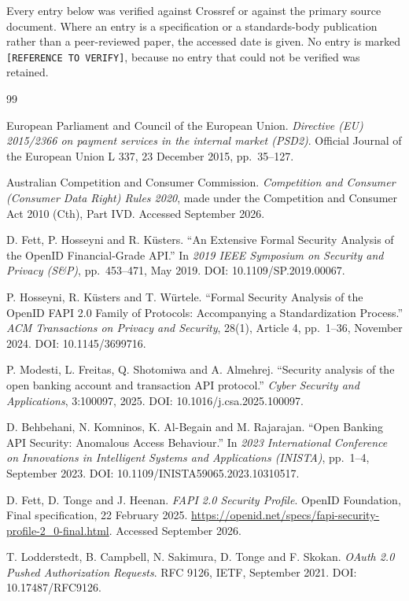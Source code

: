 Every entry below was verified against Crossref or against the primary source document. Where an entry is a specification or a standards-body publication rather than a peer-reviewed paper, the accessed date is given. No entry is marked \texttt{[REFERENCE TO VERIFY]}, because no entry that could not be verified was retained.

\begin{thebibliography}{99}

 European Parliament and Council of the European Union. \textit{Directive (EU) 2015/2366 on payment services in the internal market (PSD2)}. Official Journal of the European Union L 337, 23 December 2015, pp.~35--127.

 Australian Competition and Consumer Commission. \textit{Competition and Consumer (Consumer Data Right) Rules 2020}, made under the Competition and Consumer Act 2010 (Cth), Part IVD. Accessed September 2026.

 D. Fett, P. Hosseyni and R. K\"usters. ``An Extensive Formal Security Analysis of the OpenID Financial-Grade API.'' In \textit{2019 IEEE Symposium on Security and Privacy (S\&P)}, pp.~453--471, May 2019. DOI: 10.1109/SP.2019.00067.

 P. Hosseyni, R. K\"usters and T. W\"urtele. ``Formal Security Analysis of the OpenID FAPI 2.0 Family of Protocols: Accompanying a Standardization Process.'' \textit{ACM Transactions on Privacy and Security}, 28(1), Article 4, pp.~1--36, November 2024. DOI: 10.1145/3699716.

 P. Modesti, L. Freitas, Q. Shotomiwa and A. Almehrej. ``Security analysis of the open banking account and transaction API protocol.'' \textit{Cyber Security and Applications}, 3:100097, 2025. DOI: 10.1016/j.csa.2025.100097.

 D. Behbehani, N. Komninos, K. Al-Begain and M. Rajarajan. ``Open Banking API Security: Anomalous Access Behaviour.'' In \textit{2023 International Conference on Innovations in Intelligent Systems and Applications (INISTA)}, pp.~1--4, September 2023. DOI: 10.1109/INISTA59065.2023.10310517.

 D. Fett, D. Tonge and J. Heenan. \textit{FAPI 2.0 Security Profile}. OpenID Foundation, Final specification, 22 February 2025. \url{https://openid.net/specs/fapi-security-profile-2_0-final.html}. Accessed September 2026.

 T. Lodderstedt, B. Campbell, N. Sakimura, D. Tonge and F. Skokan. \textit{OAuth 2.0 Pushed Authorization Requests}. RFC 9126, IETF, September 2021. DOI: 10.17487/RFC9126.


\end{thebibliography}
